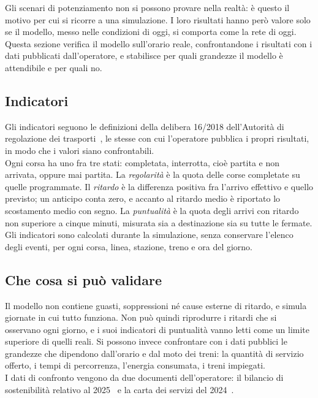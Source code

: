 Gli scenari di potenziamento non si possono provare nella realtà: è questo il motivo per cui si ricorre a una simulazione. I loro risultati hanno però valore solo se il modello, messo nelle condizioni di oggi, si comporta come la rete di oggi. Questa sezione verifica il modello sull'orario reale, confrontandone i risultati con i dati pubblicati dall'operatore, e stabilisce per quali grandezze il modello è attendibile e per quali no.

\subsection{Indicatori}
Gli indicatori seguono le definizioni della delibera 16/2018 dell'Autorità di regolazione dei trasporti~\cite{art2018delibera16}, le stesse con cui l'operatore pubblica i propri risultati, in modo che i valori siano confrontabili. \\
Ogni corsa ha uno fra tre stati: completata, interrotta, cioè partita e non arrivata, oppure mai partita. La \textit{regolarità} è la quota delle corse completate su quelle programmate. Il \textit{ritardo} è la differenza positiva fra l'arrivo effettivo e quello previsto; un anticipo conta zero, e accanto al ritardo medio è riportato lo scostamento medio con segno. La \textit{puntualità} è la quota degli arrivi con ritardo non superiore a cinque minuti, misurata sia a destinazione sia su tutte le fermate. \\
Gli indicatori sono calcolati durante la simulazione, senza conservare l'elenco degli eventi, per ogni corsa, linea, stazione, treno e ora del giorno.

\subsection{Che cosa si può validare}
Il modello non contiene guasti, soppressioni né cause esterne di ritardo, e simula giornate in cui tutto funziona. Non può quindi riprodurre i ritardi che si osservano ogni giorno, e i suoi indicatori di puntualità vanno letti come un limite superiore di quelli reali. Si possono invece confrontare con i dati pubblici le grandezze che dipendono dall'orario e dal moto dei treni: la quantità di servizio offerto, i tempi di percorrenza, l'energia consumata, i treni impiegati. \\
I dati di confronto vengono da due documenti dell'operatore: il bilancio di sostenibilità relativo al 2025~\cite{trenord2026bilancio} e la carta dei servizi del 2024~\cite{trenord2024carta}.

